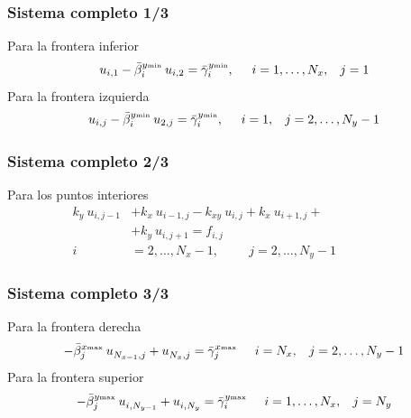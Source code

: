 \begin{frame}
\frametitle{Sistema completo 1/3}
Para la frontera inferior
\begin{equation}
u_{i, 1} - \bar{\beta}_{i}^{y {\text{\tiny{min}}}} \: u_{i, 2} = \bar{\gamma}_{i}^{y {\text{\tiny{min}}}}, \hspace{0.5cm} i = 1, \ldots, N_{x}, \hspace{0.3cm} j = 1
\label{eq:ecuacion_13_09}
\end{equation}
\pause
Para la frontera izquierda
\begin{equation}
u_{i, j} - \bar{\beta}_{i}^{y {\text{\tiny{min}}}} \: u_{2, j} = \bar{\gamma}_{i}^{y {\text{\tiny{min}}}}, \hspace{0.5cm} i = 1, \hspace{0.3cm} j = 2, \ldots, N_{y} - 1
\label{eq:ecuacion_13_10}
\end{equation}
\end{frame}
\begin{frame}
\frametitle{Sistema completo 2/3}
Para los puntos interiores
\begin{equation}
\begin{aligned}
k_{y} \: u_{i, j-1} &+ k_{x} \: u_{i-1, j} - k_{xy} \: u_{i, j} + k_{x} \: u_{i+1, j} + \\
&+ k_{y} \: u_{i, j+1} =  f_{i,j} \\
i &= 2, \ldots, N_{x} - 1, \hspace{1cm} j = 2, \ldots, N_{y} - 1 \hspace{2cm}
\end{aligned}
\label{eq:ecuacion_13_11}
\end{equation}
\end{frame}
\begin{frame}
\frametitle{Sistema completo 3/3}
Para la frontera derecha
\begin{equation}
- \bar{\beta}_{j}^{x {\text{\tiny{max}}}} \:  u^{}_{N_{x-1}, j} + u^{}_{N_{x},j}  =  \bar{\gamma}_{j}^{x {\text{\tiny{max}}}} \hspace{0.5cm} i = N_{x}, \hspace{0.3cm} j = 2, \ldots, N_{y} - 1
\label{eq:ecuacion_13_12}
\end{equation}
\pause
Para la frontera superior
\begin{equation}
- \bar{\beta}_{j}^{y {\text{\tiny{max}}}} \:  u^{}_{i, N_{y-1}} + u^{}_{i, N_{y}}  =  \bar{\gamma}_{i}^{y {\text{\tiny{max}}}} \hspace{0.5cm} i = 1, \ldots, N_{x}, \hspace{0.3cm} j = N_{y}
\label{eq:ecuacion_13_13}
\end{equation}
\end{frame}
